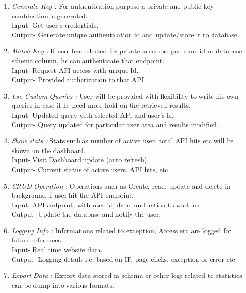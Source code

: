 \documentclass[a4paper,12pt]{report}
\begin{document}
\begin{enumerate}
{        Output- Authenticated schema (accessible only by valid authority).
      }
      \item {\emph {Generate Key : }For authentication purpose a private and public key combination is generated.\\
        Input- Get user’s credentials. \\      
        Output- Generate unique authentication id and update/store it to database.
      }
      \item {\emph {Match Key :} If user has selected for private access as per some id or database schema column, he can authenticate that endpoint.\\
        Input- Request API access with unique Id. \\
        Output- Provided authorization to that API.
      }
      \item {\emph {Use Custom Queries : }  User will be provided with flexibility to write his own queries in case if he need more hold on the retrieved results. \\
        Input- Updated query with selected API and user’s Id. \\
        Output- Query updated for particular user area and results modified.      
      }
      \item {\emph {Show stats :} Stats such as number of active user, total API hits etc will be shown on the dashboard. \\
        Input- Visit Dashboard update (auto refresh). \\
        Output- Current status of active users, API hits, etc.
      }
      \item {\emph {CRUD Operation :}  Operations such as Create, read, update and delete in background if user hit the API endpoint. \\
        Input- API endpoint, with user id; data, and action to work on. \\
        Output- Update the database and notify the user.
      }
      \item {\emph {Logging Info :} Informations related to exception, Access etc are logged for future references. \\
        Input- Real time website data. \\
        Output- Logging details i.e. based on IP, page clicks, exception or error etc.  
      }
      \item {\emph {Export Data : } Export data stored in schema or other logs related to statistics can be dump into various formats. \\
}
\end{enumerate}
\end{document}
